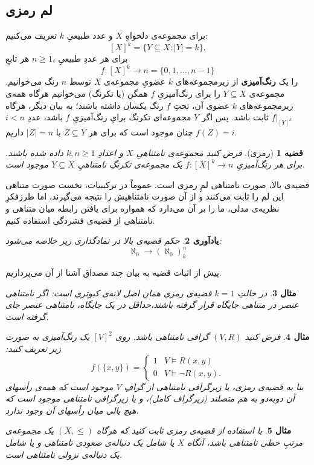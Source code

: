 \documentclass[12pt,a4paper]{report}
\theoremstyle{colorhead}
\newtheorem{thm}{قضیه}
\newtheorem{mesal}[thm]{مثال}
\newtheorem{yad}[thm]{یادآوری}
\begin{document}
\subsection{لم رمزی}
برای
مجموعه‌ی دلخواهِ
$X$ 
و عدد طبیعیِ
$k$
تعریف می‌کنیم:
\[
[X]^k=\{Y\subseteq X: |Y|=k\}.
\]
برای هر عددِ طبیعیِ
،$n\geq 1$ 
 هر تابعِ
\[
f:[X]^k\to n=\{0,1,\ldots,n-1\}
\]
را یک 
\textbf{رنگ‌آمیزی }
از زیرمجموعه‌های 
$k$
عضویِ مجموعه‌ی
$X$
توسط 
$n$
رنگ می‌خوانیم. 
مجموعه‌ی
$Y\subseteq X$
را برای رنگ‌آمیزیِ
$f$
همگن (یا تکرنگ)‌ می‌خوانیم هرگاه همه‌ی زیرمجموعه‌های
$k$
عضوی آن، تحتِ
$f$
رنگ یکسان داشته باشند؛ به بیان دیگر، هرگاه
$f|_{[Y]^k}$
ثابت باشد. پس اگر 
$Y$
مجموعه‌ای تکرنگ برایِ
رنگ‌آمیزیِ
$f$
باشد، عددِ
$i<n$
چنان موجود است که برای هر
$Z\subseteq Y$
با
$|Z|=n$
داریم
$f(Z)=i$.
\begin{thm}[رمزی]
فرض کنید مجموعه‌ی نامتناهیِ
$X$
و اعدادِ
$k,n\geq 1$
داده شده باشند.
برای 
هر رنگ‌آمیزیِ
$f:[X]^k\to n$
یک مجموعه‌ی تکرنگِ نامتناهیِ
$Y\subseteq X$
موجود است. 
\end{thm}
قضیه‌ی بالا، صورت نامتناهی لمِ رمزی است. عموماً در ترکیبیات، نخست صورت متناهی این لم را ثابت می‌کنند و از آن صورت نامتناهیش
را نتیجه‌ می‌گیرند، اما طرزفکرِ نظریه‌ی مدلی،  ما را بر آن می‌دارد که همواره برای یافتن رابطه میان متناهی و نامتناهی از قضیه‌ی فشردگی استفاده کنیم. 
\begin{yad}
حکم قضیه‌ی بالا در نمادگذاری زیر خلاصه می‌شود:
\[
\aleph_0\to (\aleph_0)^n_k
\]
\end{yad}
پیش از اثبات قضیه به بیان چند مصداق آشنا از آن می‌پردازیم.
\begin{mesal}
در حالتِ
$k=1$
قضیه‌ی رمزی همان اصل لانه‌ی کبوتری است: اگر نامتناهی عنصر در متناهی جایگاه قرار گرفته باشند،‌حداقل در یک جایگاه، نامتناهی عنصر جای گرفته است. 
\end{mesal}
\begin{mesal}
	فرض کنید
	$(V,R)$
	گرافی نامتناهی باشد. روی
	$[V]^2$
	یک رنگ‌آمیزی به صورت زیر تعریف کنید:
	\[
	f(\{x,y\})=
	\begin{cases}
1 & V\models R(x,y)	\\
0 & V\models \neg R(x,y).
	\end{cases}
	\]
	بنا به قضیه‌ی رمزی، یا زیرگرافی نامتناهی از گرافِ
	$V$
موجود است که همه‌ی رأسهای آن  دوبه‌دو به هم متصلند (زیرگراف کامل)، و یا زیرگرافی نامتناهی موجود است که هیچ یالی میان رأسهای آن 
وجود ندارد.
	\end{mesal}
\begin{mesal}
	با استفاده از قضیه‌ی رمزی ثابت کنید که هرگاه
	$(X,\leq)$
	یک مجموعه‌ی مرتبِ خطی نامتناهی باشد، آنگاه 
$X$
یا
شامل یک دنباله‌ی صعودی نامتناهی و یا شامل یک دنباله‌ی نزولی نامتناهی است.
	\end{mesal}
\end{document}
